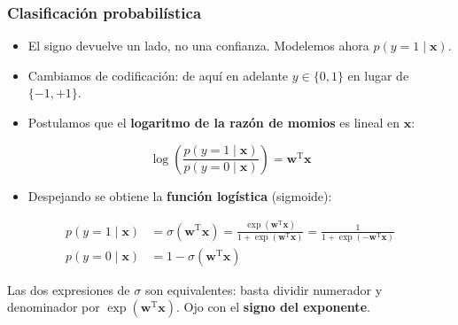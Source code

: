 \documentclass[aspectratio=169, 10pt]{beamer}
\newcommand{\formula}[1]{%
	\begin{tcolorbox}[colback=UCMBlue!8, colframe=UCMBlue, arc=4pt,
		boxsep=2pt, left=6pt, right=6pt, top=3pt, bottom=3pt]
		#1
	\end{tcolorbox}
}
\begin{document}
\begin{frame}
\frametitle{Clasificación probabilística}
\begin{itemize}
	\item El signo devuelve un lado, no una confianza. Modelemos ahora $p(y=1\mid\mathbf x)$.
	\item Cambiamos de codificaci\'on: de aqu\'i en adelante $y\in\{0,1\}$ en lugar de $\{-1,+1\}$.
	\item Postulamos que el \textbf{logaritmo de la raz\'on de momios} es lineal en $\mathbf x$:
\end{itemize}
\formula{
\[
\log\!\left(\frac{p(y=1\mid\mathbf x)}{p(y=0\mid\mathbf x)}\right) = \mathbf w^{\mathrm{T}}\mathbf x
\]}
\pause
\begin{itemize}
	\item Despejando se obtiene la \textbf{funci\'on log\'istica} (sigmoide):
\end{itemize}
\formula{
\[
\begin{aligned}
p(y=1\mid\mathbf x) &= \sigma(\mathbf w^{\mathrm{T}}\mathbf x)
= \frac{\exp(\mathbf w^{\mathrm{T}}\mathbf x)}{1+\exp(\mathbf w^{\mathrm{T}}\mathbf x)}
= \frac{1}{1+\exp(-\mathbf w^{\mathrm{T}}\mathbf x)}\\[2pt]
p(y=0\mid\mathbf x) &= 1-\sigma(\mathbf w^{\mathrm{T}}\mathbf x)
\end{aligned}
\]}
\vspace{0.1em}
\footnotesize
Las dos expresiones de $\sigma$ son equivalentes: basta dividir numerador y denominador por $\exp(\mathbf w^{\mathrm{T}}\mathbf x)$. Ojo con el \textbf{signo del exponente}.
\end{frame}
\end{document}
